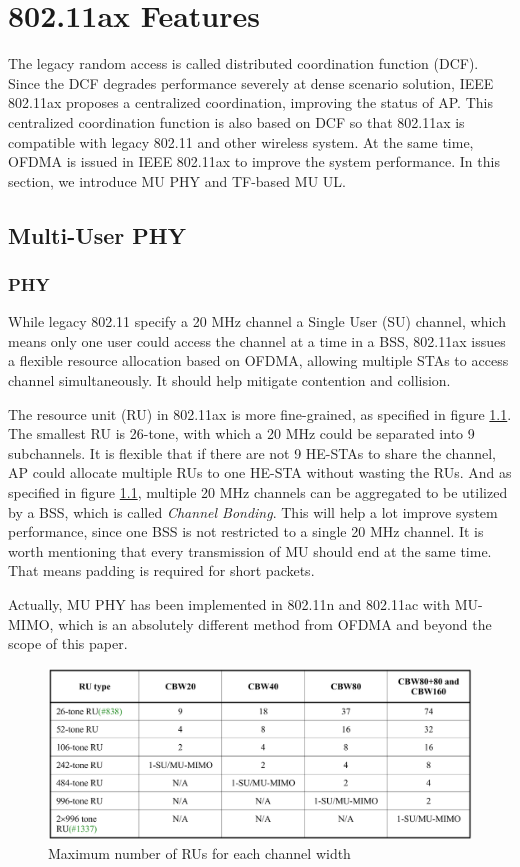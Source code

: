 \chapter{802.11ax Features}			\label{sec_ax_feature}
The legacy random access is called distributed coordination function (DCF). 
Since the DCF degrades performance severely at dense scenario solution, IEEE 802.11ax proposes a centralized coordination, improving the status of AP. 
This centralized coordination function is also based on DCF so that 802.11ax is compatible with legacy 802.11 and other wireless system. 
At the same time, OFDMA is issued in IEEE 802.11ax to improve the system performance. In this section, we introduce MU PHY and TF-based MU UL.
\section{Multi-User PHY}
\subsection{PHY}
While legacy 802.11 specify a 20 MHz channel a Single User (SU) channel, which means only one user could access the channel at a time in a BSS, 802.11ax issues a flexible resource allocation based on OFDMA, allowing multiple STAs to access channel simultaneously.
It should help mitigate contention and collision. 

The resource unit (RU) in 802.11ax is more fine-grained, as specified in figure \ref{fig_RU_spec}. The smallest RU is 26-tone, with which a 20 MHz could be separated into 9 subchannels.
It is flexible that if there are not 9 HE-STAs to share the channel, AP could allocate multiple RUs to one HE-STA without wasting the RUs.
And as specified in figure \ref{fig_RU_spec}, multiple 20 MHz channels can be aggregated to be utilized by a BSS, which is called \textit{Channel Bonding}. 
This will help a lot improve system performance, since one BSS is not restricted to a single 20 MHz channel.  
It is worth mentioning that every transmission of MU should end at the same time. That means padding is required for short packets.



Actually, MU PHY has been implemented in 802.11n and 802.11ac with MU-MIMO, which is an absolutely different method from OFDMA and beyond the scope of this paper. 

\begin{figure}[!t]
\includegraphics[scale=0.25]{./figure/RU_spec.png}
\caption{Maximum number of RUs for each channel width}
\label{fig_RU_spec}
\end{figure}


